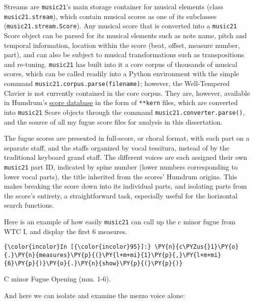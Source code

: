 Streams are \texttt{music21}'s main storage container for musical
elements (class \texttt{music21.stream}), which contain musical scores
as one of its subclasses (\texttt{music21.stream.Score}). Any musical
score that is converted into a \texttt{music21} Score object can be
parsed for its musical elements such as note name, pitch and temporal
information, location within the score (beat, offset, measure number,
part), and can also be subject to musical transformations such as
transpositions and re-tuning. \texttt{music21} has built into it a core
corpus of thousands of musical scores, which can be called readily into
a Python environment with the simple command
\texttt{music21.corpus.parse(\textquotesingle{}filename\textquotesingle{})};
however, the Well-Tempered Clavier is not currently contained in the
core corpus. They are, however, available in Humdrum's
\href{http://kern.ccarh.org/}{score database} in the form of
\texttt{**kern} files, which are converted into \texttt{music21} Score
objects through the command \texttt{music21.converter.parse()}, and the
source of all my fugue score files for analysis in this dissertation.

The fugue scores are presented in full-score, or choral format, with
each part on a separate staff, and the staffs organized by vocal
tessitura, instead of by the traditional keyboard grand staff. The
different voices are each assigned their own \texttt{music21} part ID,
indicated by spine number (lower numbers corresponding to lower vocal
parts), the title inherited from the scores' Humdrum origins. This makes
breaking the score down into its individual parts, and isolating parts
from the score's entirety, a straightforward task, especially useful for
the horizontal search functions.

Here is an example of how easily \texttt{music21} can call up the c
minor fugue from WTC I, and display the first 6 measures.


    \begin{Verbatim}[commandchars=\\\{\}]
{\color{incolor}In [{\color{incolor}95}]:} \PY{n}{c\PYZus{}1}\PY{o}{.}\PY{n}{measures}\PY{p}{(}\PY{l+m+mi}{1}\PY{p}{,}\PY{l+m+mi}{6}\PY{p}{)}\PY{o}{.}\PY{n}{show}\PY{p}{(}\PY{p}{)}
\end{Verbatim}

\begin{Example}[H]
\vspace{1.5em}
    \centering
    \caption{ C minor Fugue Opening (mm. 1-6). }
\end{Example}    
    And here we can isolate and examine the mezzo voice alone:


